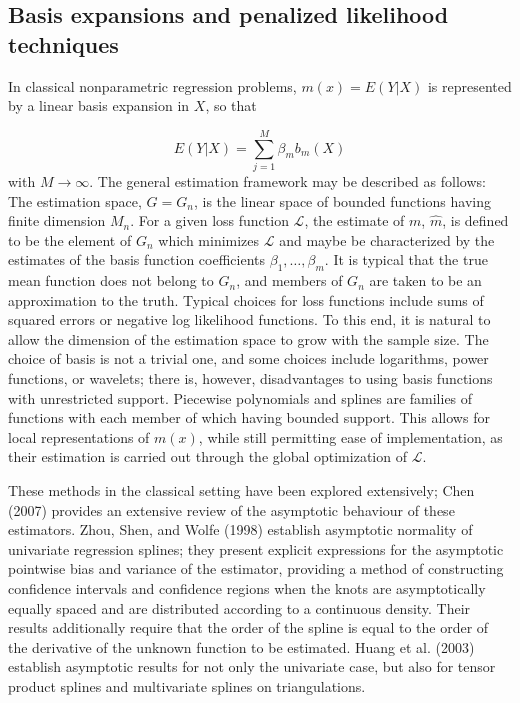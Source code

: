 \documentclass[12pt]{article}
\begin{document}
\subsection{Basis expansions and penalized likelihood techniques} \label{VC_spline_models}

In classical nonparametric regression problems, $m\left(x\right) = E\left(Y\vert X\right)$ is represented by a linear basis expansion in $X$, so that

\[
E\left(Y \vert X\right) = \sum_{j=1}^M \beta_m b_m\left(X\right)
\]
\noindent
with $M \rightarrow \infty$. The general estimation framework may be described as follows: The estimation space, $G = G_n$, is the linear space of bounded functions having finite dimension $M_n$. For a given loss function $\mathcal{L}$, the estimate of $m$, $\hat{m}$, is defined to be the element of $G_n$ which minimizes $\mathcal{L}$ and maybe be characterized by the estimates of the basis function coefficients $\beta_1,\dots, \beta_m$. It is typical that the true mean function does not belong to $G_n$, and members of $G_n$ are taken to be an approximation to the truth. Typical choices for loss functions include sums of squared errors or negative log likelihood functions. To this end, it is natural to allow the dimension of the estimation space to grow with the sample size. The choice of basis is not a trivial one, and some choices include logarithms, power functions, or wavelets; there is, however, disadvantages to using basis functions with unrestricted support. Piecewise polynomials and splines are families of functions with each member of which having bounded support. This allows for local representations of $m\left(x\right)$, while still permitting ease of implementation, as their estimation is carried out through the global optimization of $\mathcal{L}$. 

These methods in the classical setting have been explored extensively; Chen (2007) provides an extensive review of the asymptotic behaviour of these estimators. Zhou, Shen, and Wolfe (1998) establish asymptotic normality of univariate regression splines; they present explicit expressions for the asymptotic pointwise bias and variance of the estimator, providing a method of constructing confidence intervals and confidence regions when the knots are asymptotically equally spaced and are distributed according to a continuous density. Their results additionally require that the order of the spline is equal to the order of the derivative of the unknown function to be estimated. Huang et al. (2003) establish asymptotic results for not only the univariate case, but also for tensor product splines and multivariate splines on triangulations.  
\end{document}
